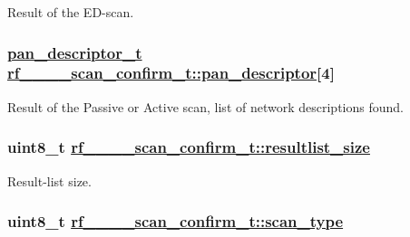 Result of the ED-scan. \hypertarget{structrf__802__15__4__scan__confirm__t_54212a819202dc21a64ea73e630de2bc}{
\subsubsection[pan\_\-descriptor]{\setlength{\rightskip}{0pt plus 5cm}\hyperlink{structpan__descriptor__t}{pan\_\-descriptor\_\-t} \hyperlink{structrf__802__15__4__scan__confirm__t_54212a819202dc21a64ea73e630de2bc}{rf\_\_\_\_\-scan\_\-confirm\_\-t::pan\_\-descriptor}\mbox{[}4\mbox{]}}}
\label{structrf__802__15__4__scan__confirm__t_54212a819202dc21a64ea73e630de2bc}


Result of the Passive or Active scan, list of network descriptions found. \hypertarget{structrf__802__15__4__scan__confirm__t_69e1e9a757f57301370d4e4229aa60da}{
\subsubsection[resultlist\_\-size]{\setlength{\rightskip}{0pt plus 5cm}uint8\_\-t \hyperlink{structrf__802__15__4__scan__confirm__t_69e1e9a757f57301370d4e4229aa60da}{rf\_\_\_\_\-scan\_\-confirm\_\-t::resultlist\_\-size}}}
\label{structrf__802__15__4__scan__confirm__t_69e1e9a757f57301370d4e4229aa60da}


Result-list size. \hypertarget{structrf__802__15__4__scan__confirm__t_4b7a9839e5e9d6f309257bb0a1f36a5b}{
\subsubsection[scan\_\-type]{\setlength{\rightskip}{0pt plus 5cm}uint8\_\-t \hyperlink{structrf__802__15__4__scan__confirm__t_4b7a9839e5e9d6f309257bb0a1f36a5b}{rf\_\_\_\_\-scan\_\-confirm\_\-t::scan\_\-type}}}
\label{structrf__802__15__4__scan__confirm__t_4b7a9839e5e9d6f309257bb0a1f36a5b}


